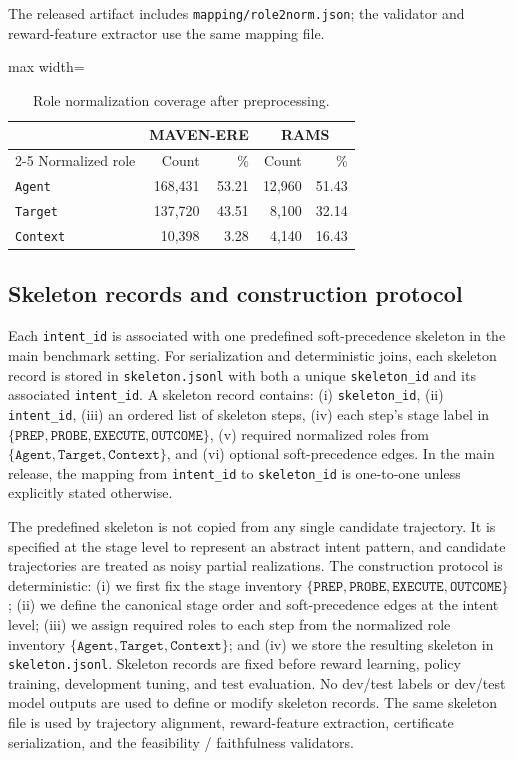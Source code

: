 \documentclass{article}
\begin{document}
The released artifact includes \texttt{mapping/role2norm.json}; the validator and reward-feature extractor use the same mapping file.

\begin{table}[t]
\centering
\caption{Role normalization coverage after preprocessing.}
\label{tab:role_mapping_coverage}
\small
\begin{adjustbox}{max width=\linewidth}
\begin{tabular}{lrr|rr}
\hline
& \multicolumn{2}{c|}{MAVEN-ERE} & \multicolumn{2}{c}{RAMS} \\
\cline{2-5}
Normalized role & Count & \% & Count & \% \\
\hline
\texttt{Agent} & 168{,}431 & 53.21 & 12{,}960 & 51.43 \\
\texttt{Target} & 137{,}720 & 43.51 & 8{,}100 & 32.14 \\
\texttt{Context} & 10{,}398 & 3.28 & 4{,}140 & 16.43 \\
\hline
\end{tabular}
\end{adjustbox}
\end{table}

\subsection{Skeleton records and construction protocol}
\label{sec:app_skeleton_construction}

Each \texttt{intent\_id} is associated with one predefined soft-precedence skeleton in the main benchmark setting.
For serialization and deterministic joins, each skeleton record is stored in \texttt{skeleton.jsonl} with both a unique \texttt{skeleton\_id} and its associated \texttt{intent\_id}.
A skeleton record contains:
(i) \texttt{skeleton\_id},
(ii) \texttt{intent\_id},
(iii) an ordered list of skeleton steps,
(iv) each step's stage label in
$\{\texttt{PREP},\texttt{PROBE},\texttt{EXECUTE},\texttt{OUTCOME}\}$,
(v) required normalized roles from
$\{\texttt{Agent},\texttt{Target},\texttt{Context}\}$,
and (vi) optional soft-precedence edges.
In the main release, the mapping from \texttt{intent\_id} to \texttt{skeleton\_id} is one-to-one unless explicitly stated otherwise.

The predefined skeleton is not copied from any single candidate trajectory.
It is specified at the stage level to represent an abstract intent pattern, and candidate trajectories are treated as noisy partial realizations.
The construction protocol is deterministic:
(i) we first fix the stage inventory
$\{\texttt{PREP},\texttt{PROBE},\texttt{EXECUTE},\texttt{OUTCOME}\}$;
(ii) we define the canonical stage order and soft-precedence edges at the intent level;
(iii) we assign required roles to each step from the normalized role inventory
$\{\texttt{Agent},\texttt{Target},\texttt{Context}\}$;
and (iv) we store the resulting skeleton in \texttt{skeleton.jsonl}.
Skeleton records are fixed before reward learning, policy training, development tuning, and test evaluation.
No dev/test labels or dev/test model outputs are used to define or modify skeleton records.
The same skeleton file is used by trajectory alignment, reward-feature extraction, certificate serialization, and the feasibility / faithfulness validators.
\end{document}
